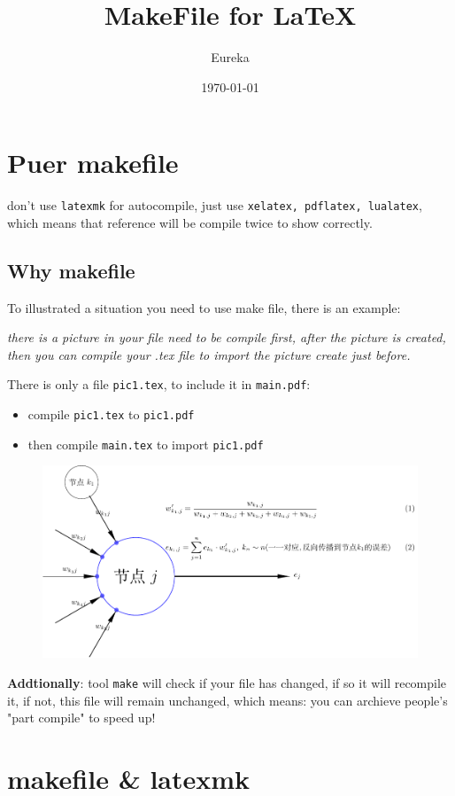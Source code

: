 \documentclass{article}
\title{MakeFile for \LaTeX{}}
\date{\today}
\author{Eureka}
\begin{document}
\maketitle

\section{Puer makefile}
don't use \verb|latexmk| for autocompile, just 
use \verb|xelatex, pdflatex, lualatex|, which means 
that reference will be compile twice to show correctly.



\subsection{Why makefile}
To illustrated a situation you need to use make file,
there is an example:

{\itshape
    there is a picture in your file need to be compile first,
    after the picture is created, then you can compile your 
    .tex file to import the picture create just before.
}


There is only a file \verb|pic1.tex|, to include it in \verb|main.pdf|:
\begin{itemize}
    \item compile \verb|pic1.tex| to \verb|pic1.pdf|
    \item then compile \verb|main.tex| to import \verb|pic1.pdf|
\end{itemize}


\begin{figure}[H]
    \centering
    \includegraphics[width=.5\linewidth]{./Pic1.pdf}
\end{figure}

\textbf{Addtionally}: tool \verb|make| will check if your file 
has changed, if so it will recompile it, if not, this file will 
remain unchanged, which means: you can archieve people's "part compile"
to speed up!



\section{makefile \& latexmk}
\end{document}
